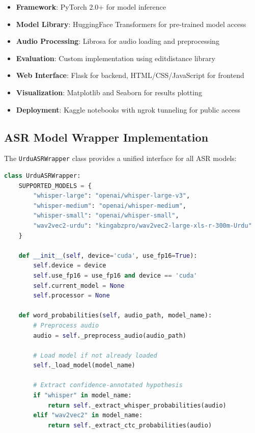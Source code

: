 \begin{itemize}
    \item \textbf{Framework}: PyTorch 2.0+ for model inference
    \item \textbf{Model Library}: HuggingFace Transformers for pre-trained model access
    \item \textbf{Audio Processing}: Librosa for audio loading and preprocessing
    \item \textbf{Evaluation}: Custom implementation using editdistance library
    \item \textbf{Web Interface}: Flask for backend, HTML/CSS/JavaScript for frontend
    \item \textbf{Visualization}: Matplotlib and Seaborn for results plotting
    \item \textbf{Deployment}: Kaggle notebooks with ngrok tunneling for public access
\end{itemize}

\subsection{ASR Model Wrapper Implementation}

The \texttt{UrduASRWrapper} class provides a unified interface for all ASR models:

\begin{lstlisting}[language=Python, caption=Core ASR Wrapper Structure]
class UrduASRWrapper:
    SUPPORTED_MODELS = {
        "whisper-large": "openai/whisper-large-v3",
        "whisper-medium": "openai/whisper-medium",
        "whisper-small": "openai/whisper-small",
        "wav2vec2-urdu": "kingabzpro/wav2vec2-large-xls-r-300m-Urdu"
    }
    
    def __init__(self, device='cuda', use_fp16=True):
        self.device = device
        self.use_fp16 = use_fp16 and device == 'cuda'
        self.current_model = None
        self.processor = None
        
    def word_probabilities(self, audio_path, model_name):
        # Preprocess audio
        audio = self._preprocess_audio(audio_path)
        
        # Load model if not already loaded
        self._load_model(model_name)
        
        # Extract confidence-annotated hypothesis
        if "whisper" in model_name:
            return self._extract_whisper_probabilities(audio)
        elif "wav2vec2" in model_name:
            return self._extract_ctc_probabilities(audio)
\end{lstlisting}

